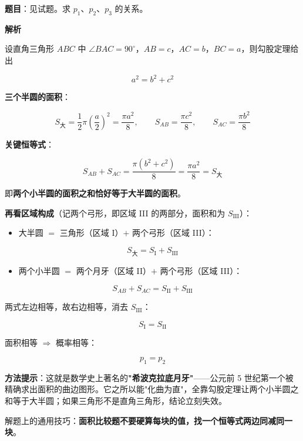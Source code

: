 \par\medskip


\textbf{题目}：见试题。求 $p_1$、$p_2$、$p_3$ 的关系。

\begin{center}\end{center}

\textbf{解析}

设直角三角形 $ABC$ 中 $\angle BAC=90^\circ$，$AB=c$，$AC=b$，$BC=a$，则勾股定理给出

\[a^{2}=b^{2}+c^{2}\]

\textbf{三个半圆的面积}：

\[S_{\text{大}}=\frac12\pi\left(\frac a2\right)^{2}=\frac{\pi a^{2}}8,\qquad S_{AB}=\frac{\pi c^{2}}8,\qquad S_{AC}=\frac{\pi b^{2}}8\]

\textbf{关键恒等式}：

\[S_{AB}+S_{AC}=\frac{\pi\left(b^{2}+c^{2}\right)}8=\frac{\pi a^{2}}8=S_{\text{大}}\]

即\textbf{两个小半圆的面积之和恰好等于大半圆的面积}。

\textbf{再看区域构成}（记两个弓形，即区域 III 的两部分，面积和为 $S_{\text{III}}$）：

\begin{itemize}
\item 大半圆 $=$ 三角形（区域 I）$+$ 两个弓形（区域 III）：
\end{itemize}
\[S_{\text{大}}=S_{\text{I}}+S_{\text{III}}\]
\begin{itemize}
\item 两个小半圆 $=$ 两个月牙（区域 II）$+$ 两个弓形（区域 III）：
\end{itemize}
\[S_{AB}+S_{AC}=S_{\text{II}}+S_{\text{III}}\]

两式左边相等，故右边相等，消去 $S_{\text{III}}$：

\[S_{\text{I}}=S_{\text{II}}\]

面积相等 $\Rightarrow$ 概率相等：

\[p_1=p_2\]


\begin{gktip}
\textbf{方法提示}：这就是数学史上著名的\textbf{"希波克拉底月牙"}——公元前 5 世纪第一个被精确求出面积的曲边图形。它之所以能"化曲为直"，全靠勾股定理让两个小半圆之和等于大半圆；如果三角形不是直角三角形，结论立刻失效。

解题上的通用技巧：\textbf{面积比较题不要硬算每块的值，找一个恒等式两边同减同一块}。
\end{gktip}

